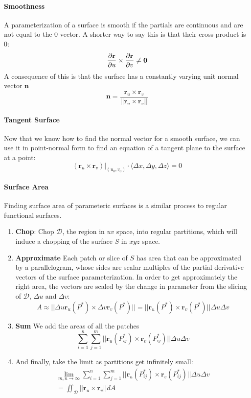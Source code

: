 \documentclass{article}
\begin{document}
\paragraph{Smoothness} A parameterization of a surface is smooth if the partials are continuous and are not equal to the 0 vector. A shorter way to say this is that their cross product is 0:
\[ \frac{\partial \mathbf{r}}{\partial u} \times \frac{\partial \mathbf{r}}{\partial v} \neq \mathbf{0} \]
A consequence of this is that the surface has a constantly varying unit normal vector $\mathbf{n}$
\[ \mathbf{n} = \frac{\mathbf{r}_u \times \mathbf{r}_v}{||\mathbf{r}_u \times \mathbf{r}_v||} \]

\paragraph{Tangent Surface} Now that we know how to find the normal vector for a smooth surface, we can use it in point-normal form to find an equation of a tangent plane to the surface at a point:
\[(\mathbf{r}_u \times \mathbf{r}_v)|_{(u_0, v_0)} \cdot \langle \Delta x, \Delta y, \Delta z \rangle =0 \]

\paragraph{Surface Area} Finding surface area of parameteric surfaces is a similar process to regular functional surfaces.
\begin{enumerate}
    \item \textbf{Chop}: Chop $\mathcal{D}$, the region in $uv$ space, into regular partitions, which will induce a chopping of the surface $S$ in $xyz$ space.
    \item \textbf{Approximate} Each patch or slice of $S$ has area that can be approximated by a parallelogram, whose sides are scalar multiples of the partial derivative vectors of the surface parameterization. In order to get approximately the right area, the vectors are scaled by the change in parameter from the slicing of $\mathcal{D}$, $\Delta u$ and $\Delta v$:
    \[ A \approx ||\Delta u \mathbf{r}_u(P^*) \times \Delta v \mathbf{r}_v(P^*)|| = ||\mathbf{r}_u(P^*) \times \mathbf{r}_v(P^*)|| \Delta u \Delta v\]
    \item \textbf{Sum} We add the areas of all the patches
    \[ \sum_{i=1}^n \sum_{j=1}^m ||\mathbf{r}_u(P_{ij}^*) \times \mathbf{r}_v(P_{ij}^*)||\Delta u \Delta v\]
    \item And finally, take the limit as partitions get infinitely small:
    \begin{gather*}
        \lim_{m,n \to \infty} \sum_{i=1}^n \sum_{j=1}^m ||\mathbf{r}_u(P_{ij}^*) \times \mathbf{r}_v(P_{ij}^*)||\Delta u \Delta v\\
        = \iint_{\mathcal{D}} ||\mathbf{r}_u \times \mathbf{r}_v||dA
    \end{gather*}
\end{enumerate}
\end{document}
